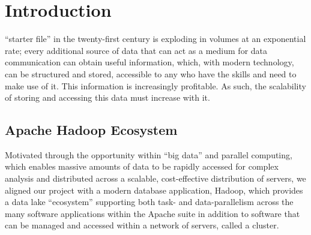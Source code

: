 \documentclass[journal]{IEEEtran}
\begin{document}
%
\IEEEpeerreviewmaketitle



\section{Introduction}
% 
% 
% 
% 
 ``starter file'' in the twenty-first century is exploding in volumes at an exponential rate; every additional source of data that can act as a medium for data communication can obtain useful information, which, with modern technology, can be structured and stored, accessible to any who have the skills and need to make use of it. This information is increasingly profitable. As such, the scalability of storing and accessing this data must increase with it.

\subsection{Apache Hadoop Ecosystem}
Motivated through the opportunity within ``big data'' and parallel computing, which enables massive amounts of data to be rapidly accessed for complex analysis and distributed across a scalable, cost-effective distribution of servers, we aligned our project with a modern database application, Hadoop, which provides a data lake ``ecosystem'' supporting both task- and data-parallelism across the many software applications within the Apache suite in addition to software that can be managed and accessed within a network of servers, called a cluster.
\end{document}
